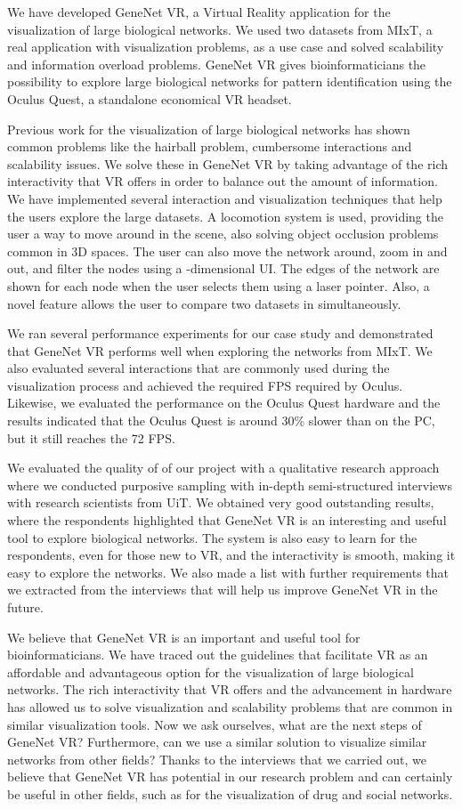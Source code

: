 We have developed GeneNet VR, a Virtual Reality application for the visualization of large biological networks. We used two datasets from MIxT, a real application with visualization problems, as a use case and solved scalability and information overload problems. GeneNet VR gives bioinformaticians the possibility to explore large biological networks for pattern identification using the Oculus Quest, a standalone economical VR headset.

Previous work for the visualization of large biological networks has shown common problems like the hairball problem, cumbersome interactions and scalability issues. We solve these in GeneNet VR by taking advantage of the rich interactivity that VR offers in order to balance out the amount of information. We have implemented several interaction and visualization techniques that help the users explore the large datasets. A locomotion system is used, providing the user a way to move around in the scene, also solving object occlusion problems common in 3D spaces. The user can also move the network around, zoom in and out, and filter the nodes using a -dimensional UI. The edges of the network are shown for each node when the user selects them using a laser pointer. Also, a novel feature allows the user to compare two datasets in simultaneously.

We ran several performance experiments for our case study and demonstrated that GeneNet VR performs well when exploring the networks from MIxT. We also evaluated several interactions that are commonly used during the visualization process and achieved the required FPS required by Oculus. Likewise, we evaluated the performance on the Oculus Quest hardware and the results indicated that the Oculus Quest is around 30\% slower than on the PC, but it still reaches the 72 FPS.

We evaluated the quality of of our project with a qualitative research approach where we conducted purposive sampling with in-depth semi-structured interviews with research scientists from UiT. We obtained very good outstanding results, where the respondents highlighted that GeneNet VR is an interesting and useful tool to explore biological networks. The system is also easy to learn for the respondents, even for those new to VR, and the interactivity is smooth, making it easy to explore the networks. We also made a list with further requirements that we extracted from the interviews that will help us improve GeneNet VR in the future.

We believe that GeneNet VR is an important and useful tool for bioinformaticians. We have traced out the guidelines that facilitate VR as an affordable and advantageous option for the visualization of large biological networks. The rich interactivity that VR offers and the advancement in hardware has allowed us to solve visualization and scalability problems that are common in similar visualization tools. Now we ask ourselves, what are the next steps of GeneNet VR? Furthermore, can we use a similar solution to visualize similar networks from other fields? Thanks to the interviews that we carried out, we believe that GeneNet VR has potential in our research problem and can certainly be useful in other fields, such as for the visualization of drug and social networks.
